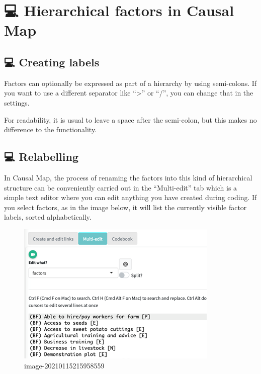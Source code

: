 \documentclass[
]{book}
\begin{document}
\hypertarget{hierarchical-factors-in-causal-map}{%
\section{💻 Hierarchical factors in Causal Map}\label{hierarchical-factors-in-causal-map}}

\hypertarget{creating-labels}{%
\subsection{💻 Creating labels}\label{creating-labels}}

Factors can optionally be expressed as part of a hierarchy by using semi-colons. If you want to use a different separator like ``\textgreater{}'' or ``/'', you can change that in the settings.

For readability, it is usual to leave a space after the semi-colon, but this makes no difference to the functionality.

\hypertarget{relabelling}{%
\subsection{💻 Relabelling}\label{relabelling}}

In Causal Map, the process of renaming the factors into this kind of hierarchical structure can be conveniently carried out in the ``Multi-edit'' tab which is a simple text editor where you can edit anything you have created during coding. If you select factors, as in the image below, it will list the currently visible factor labels, sorted alphabetically.

\begin{figure}
\centering
\includegraphics{_assets/image-20210115215958559.png}
\caption{image-20210115215958559}
\end{figure}
\end{document}
